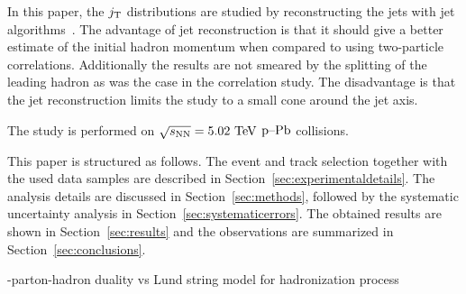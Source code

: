 In this paper, the $j_{\rm T}$ distributions are studied by reconstructing the jets with jet algorithms~\cite{jetFinding}. The advantage of jet reconstruction is that it should give a better estimate of the initial hadron momentum when compared to using two-particle correlations. Additionally the results are not smeared by the splitting of the leading hadron as was the case in the correlation study. The disadvantage is that the jet reconstruction limits the study to a small cone around the jet axis.

The study is performed on $\sqrt{s_{\mathrm{NN}}} = 5.02~\mathrm{TeV}$ $\mbox{p--Pb}$ collisions. 

This paper is structured as follows. The event and track selection together with the used data samples are described in Section~\ref{sec:experimentaldetails}. The analysis details are discussed in Section~\ref{sec:methods}, followed by the systematic uncertainty analysis in Section~\ref{sec:systematicerrors}. The obtained results are shown in Section~\ref{sec:results} and the observations are summarized in Section~\ref{sec:conclusions}.

 
 

-parton-hadron duality vs Lund string model for hadronization process



